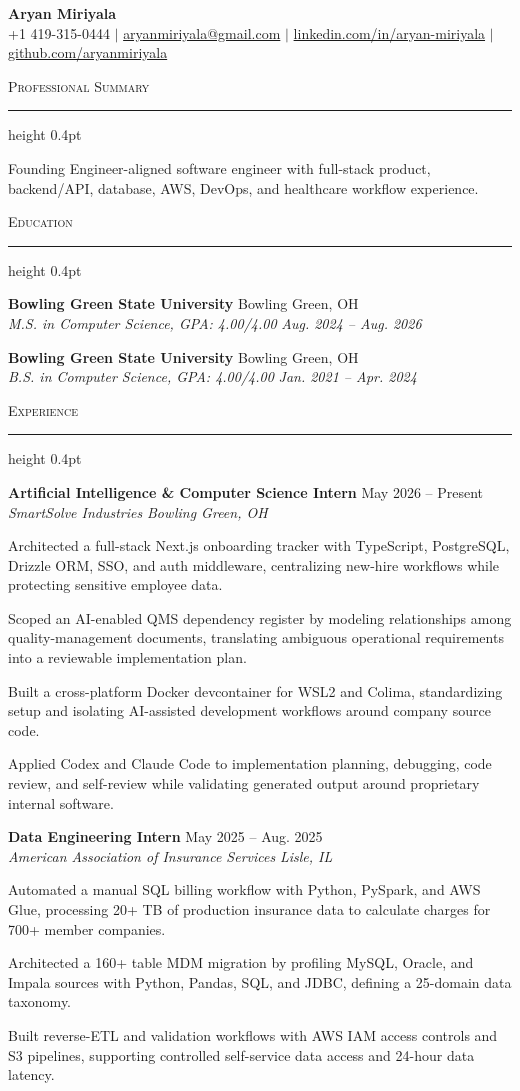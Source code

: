 \documentclass[letterpaper,11pt]{article}
\newcommand{\resumesection}[1]{%
  \par\vspace{2pt}%
  {\large\scshape #1}\par\vspace{2pt}%
  \hrule height 0.4pt\vspace{2pt}%
}
\newcommand{\resumeSubheading}[4]{
  \textbf{#1} \hfill #2\\
  \textit{#3} \hfill \textit{#4}
}
\begin{document}
\begin{center}
  {\LARGE \textbf{Aryan Miriyala}}\\[-1pt]
  \small
  +1 419-315-0444 $|$
  \href{mailto:aryanmiriyala@gmail.com}{aryanmiriyala@gmail.com} $|$
  \href{https://www.linkedin.com/in/aryan-miriyala-7788a21b6/}{linkedin.com/in/aryan-miriyala} $|$
  \href{https://github.com/aryanmiriyala}{github.com/aryanmiriyala}
\end{center}\vspace{-10pt}

\resumesection{Professional Summary}
Founding Engineer-aligned software engineer with full-stack product, backend/API, database, AWS, DevOps, and healthcare workflow experience.

\resumesection{Education}
\resumeSubheading
{Bowling Green State University}{Bowling Green, OH}
{M.S. in Computer Science, GPA: 4.00/4.00}{Aug. 2024 -- Aug. 2026}

\resumeSubheading
{Bowling Green State University}{Bowling Green, OH}
{B.S. in Computer Science, GPA: 4.00/4.00}{Jan. 2021 -- Apr. 2024}

\resumesection{Experience}
\resumeSubheading
{Artificial Intelligence \& Computer Science Intern}{May 2026 -- Present}
{SmartSolve Industries}{Bowling Green, OH}
\begin{tightitemize}
  \item Architected a full-stack Next.js onboarding tracker with TypeScript, PostgreSQL, Drizzle ORM, SSO, and auth middleware, centralizing new-hire workflows while protecting sensitive employee data.
  \item Scoped an AI-enabled QMS dependency register by modeling relationships among quality-management documents, translating ambiguous operational requirements into a reviewable implementation plan.
  \item Built a cross-platform Docker devcontainer for WSL2 and Colima, standardizing setup and isolating AI-assisted development workflows around company source code.
  \item Applied Codex and Claude Code to implementation planning, debugging, code review, and self-review while validating generated output around proprietary internal software.
\end{tightitemize}

\resumeSubheading
{Data Engineering Intern}{May 2025 -- Aug. 2025}
{American Association of Insurance Services}{Lisle, IL}
\begin{tightitemize}
  \item Automated a manual SQL billing workflow with Python, PySpark, and AWS Glue, processing 20+ TB of production insurance data to calculate charges for 700+ member companies.
  \item Architected a 160+ table MDM migration by profiling MySQL, Oracle, and Impala sources with Python, Pandas, SQL, and JDBC, defining a 25-domain data taxonomy.
  \item Built reverse-ETL and validation workflows with AWS IAM access controls and S3 pipelines, supporting controlled self-service data access and 24-hour data latency.
\end{tightitemize}
\end{document}
